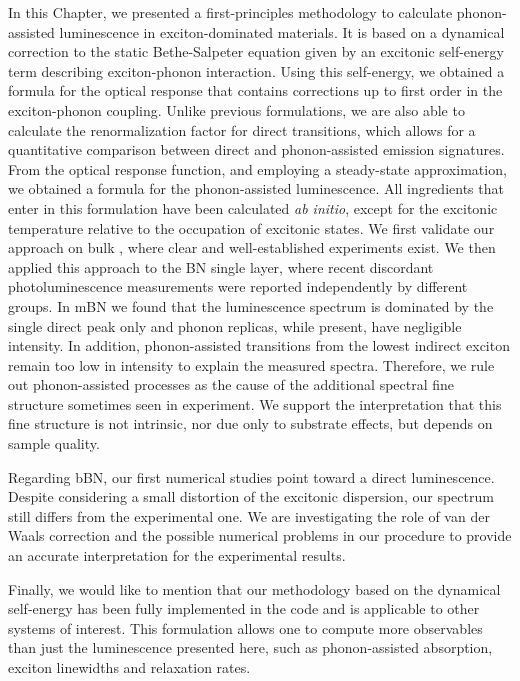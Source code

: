In this Chapter, we presented a first-principles methodology to calculate phonon-assisted luminescence in exciton-dominated materials. It is based on a dynamical correction to the static Bethe-Salpeter equation given by an excitonic self-energy term describing exciton-phonon interaction. Using this self-energy, we obtained a formula for the optical response that contains corrections up to first order in the exciton-phonon coupling.
Unlike previous formulations, we are also able to calculate the renormalization factor for direct transitions, which allows for a quantitative comparison between direct and phonon-assisted emission signatures.
From the optical response function, and employing a steady-state approximation, we obtained a formula for the phonon-assisted luminescence. All ingredients that enter in this formulation have been calculated \emph{ab initio}, except for the excitonic temperature relative to the occupation of excitonic states.
We first validate our approach on bulk \hbn, where clear and well-established experiments exist. We then applied this approach to the BN single layer, where recent discordant photoluminescence measurements were reported independently by different groups. In mBN we found that the luminescence spectrum is dominated by the single direct peak only and phonon replicas, while present, have negligible intensity. In addition, 
phonon-assisted transitions from the lowest indirect exciton remain too low in intensity to explain the measured spectra. Therefore, we rule out phonon-assisted processes as the cause of the additional spectral fine structure sometimes seen in experiment.
We support the interpretation that this fine structure is not intrinsic, nor due only to substrate effects, but depends on sample quality.

Regarding \acrshort{bBN}, our first numerical studies point toward a direct luminescence. Despite considering a small distortion of the excitonic dispersion, our spectrum still differs from the experimental one. We are investigating the role of van der Waals correction and the possible numerical problems in our procedure to provide an accurate interpretation for the experimental results.

Finally, we would like to mention that our methodology based on the dynamical self-energy has been fully implemented in the \yambo code and is applicable to other systems of interest. This formulation allows one to compute more observables than just the luminescence presented here, such as phonon-assisted absorption, exciton linewidths and relaxation rates.
